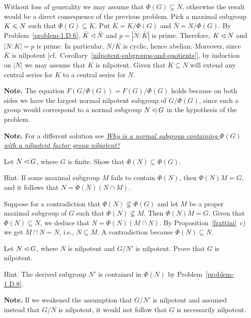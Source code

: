 \begin{solution} Without loss of generality we may assume that $\Phi(G)\varsubsetneq N$, otherwise the result would be a direct consequence of the previous problem. Pick a maximal subgroup $K\leqslant N$ such that $\Phi(G)\subseteq K$. Put $\bar K=K/\Phi(G)$ and $\bar N=N/\Phi(G)$. By Problem~\ref{problem-1.D.6}, $\bar K\lhd\bar N$ and $p=|\bar N:\bar K|$ is prime. Therefore, $K\lhd N$ and $|N:K|=p$ is prime. In particular, $N/K$ is cyclic, hence abelian. Moreover, since $\bar K$ is nilpotent [cf.~Corollary~\ref{nilpotent-subgroups-and-quotients}], by induction on $|N|$ we may assume that $K$ is nilpotent. Given that $K\subseteq N$ will extend any central series for $K$ to a central series for $N$.  \end{solution}

\textbf{Note.} The equation $F(G/\Phi(G)) = F(G)/\Phi(G)$ holds because on both sides we have the largest normal nilpotent subgroup of $G/\Phi(G)$, since such a group would correspond to a normal subgroup $N\lhd G$ in the hypothesis of the problem.

\textbf{Note.} For a different solution see \href{https://math.stackexchange.com/a/209225/269050}{\it Why is a normal subgroup containing $\Phi(G)$ with a nilpotent factor group nilpotent?}


\begin{probl}\label{problem-2.D.16}
    Let\/ $N\lhd G$, where\/ $G$ is finite. Show that\/ $\Phi(N) \subseteq \Phi(G)$.

    \textrm{\rm Hint. If some maximal subgroup $M$ fails to contain $\Phi(N)$, then $\Phi(N)M= G$, and it follows that $N = \Phi(N)(N\cap M)$.}
\end{probl}

\begin{solution} Suppose for a contradiction that $\Phi(N)\not\subseteq\Phi(G)$ and let $M$ be a proper maximal subgroup of $G$ such that $\Phi(N)\not\subseteq M$. Then $\Phi(N)M=G$. Given that $\Phi(N)\subseteq N$, we deduce that $N=\Phi(N)(M\cap N)$. By Proposition~\ref{frattini}~c) we get $M\cap N=N$, i.e., $N\subseteq M$. A contradiction because $\Phi(N)\subseteq N$.  \end{solution}

\begin{probl}
    Let $N\lhd G$, where $N$ is nilpotent and\/ $G/N'$ is nilpotent. Prove that\/ $G$ is nilpotent.
    
    \textrm{\rm Hint. The derived subgroup $N'$ is contained in $\Phi(N)$ by Problem~\ref{problem-1.D.8}.}

    \textrm{\rm {\bf Note.} If we weakened the assumption that $G/N'$ is nilpotent and assumed instead that $G/N$ is nilpotent, it would not follow that $G$ is necessarily nilpotent.}
\end{probl}

